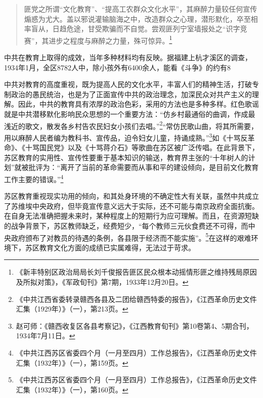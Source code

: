\begin{quote}

匪党之所谓“文化教育”、“提高工农群众文化水平”，其麻醉力量较任何宣传煽惑为尤大。盖以邪说灌输脑海之中，改造群众之心理，潜形默化，卒至相率盲从，日趋危途，甘受欺骗而不自觉。尝观匪列宁室墙报处之“识字竞赛”，其进步之程度与麻醉之力量，殊可惊异。\footnote{《新丰特别区政治局局长刘千俊报告匪区民众根本动摇情形匪之维持残局原因及所拟对策》，《军政旬刊》第7期，1933年12月20日。}
\end{quote}


中共在教育上取得的成效，当年多种材料均有反映。据福建上杭才溪区的调查，1934年1月，全区8782人中，除小孩外有6400余人，能看《斗争》的约有8%


中共对教育的高度重视，既为提高人民的文化水平，丰富人们的精神生活，打破专制政治的愚民统治，也是为了正面宣传中共的政治理念，加深民众对共产主义的理解。因此，中共的教育具有浓厚的政治色彩，采用的方法也是多种多样。红色歌谣就是中共潜移默化影响民众思想的一个重要方法：“仿乡村最通俗的曲调，作成最浅近的歌文，散发各乡村告农民妇女小孩们去唱。”\footnote{《中共江西省委转录赣西各县及二团给赣西特委的报告》，《江西革命历史文件汇集（1929年）》（一），第213页。}“常仿民歌山曲，将其所需要，用以麻醉人民者编为教科书、宣传品，迫令妇女儿童，持诵成熟。”\footnote{赵可师：《赣西收复区各县考察记》，《江西教育旬刊》第10卷第4、5期合刊，1934年7月11日。}如《十骂反革命》、《十骂国民党》以及《十骂蒋介石》等歌曲在苏区被广泛传唱。在此背景下，苏区教育的实用性、宣传性要重于基本知识的输送，教育界主张的“十年树人的计划”就被批评为：“离开了当前的革命需要而从事和平的建设倾向，是目前文化教育工作主要的错误。”\footnote{《中共江西苏区省委四个月（一月至四月）工作总报告》，《江西革命历史文件汇集（1932年）》（一），第159页。}


苏区教育重视现实功用的倾向，和其处身环境的不确定性大有关联，虽然中共成立了苏维埃中央政府，但毕竟宣传意义远大于实际，还不可能与南京政府全面抗衡。在自身无法准确把握未来时，某种程度上的短期行为应可理解。而且，在资源短缺的战争背景下，苏区教师缺乏，经费短少，“每个教师三元伙食费还不可得，而中央政府颁布了对教员的待遇的条例，各县限于经济而不能实施”。\footnote{《中共江西苏区省委四个月（一月至四月）工作总报告》，《江西革命历史文件汇集（1932年）》（一），第160页。}在这样的艰难环境下，苏区教育文化方面的成绩已实属难得，无法过于苛求。


